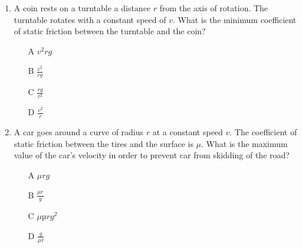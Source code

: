 \begin{enumerate}
\item A coin rests on a turntable a distance $r$ from the axis of rotation.
The turntable rotates with a constant speed of $v$.
What is the minimum coefficient of static friction between the turntable and the coin?

\begin{itemize}
\item[A] $v^2rg$
\item[B] $\frac{v^2}{rg}$
\item[C] $\frac{rg}{v^2}$
\item[D] $\frac{v^2}{r}$
\end{itemize}


\item A car goes around a curve of radius $r$ at a constant speed $v$.
The coefficient of static friction between the tires and the surface is $\mu$.
What is the maximum value of the car’s velocity in order to prevent car from skidding of the road? 
 
\begin{itemize}
\item[A] $\mu rg$
\item[B] $\frac{\mu r}{g}$
\item[C] ${\mu µrg}^2$
\item[D] $\frac{g}{\mu r}$
\end{itemize}



\end{enumerate}

